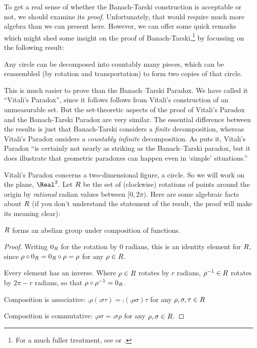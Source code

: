 \documentclass[../../../include/open-logic-section]{subfiles}
\begin{document}

To get a real sense of whether the Banach-Tarski construction is
acceptable or not, we should examine its \emph{proof}. Unfortunately,
that would require much more algebra than we can present here.
However, we can offer some quick remarks which might shed some insight
on the proof of Banach-Tarski,\footnote{For a much fuller treatment,
see \cite{Weston2003} or \cite{Wagon2016}.} by focussing on the
following result:

\begin{thm}
Any circle can be decomposed into countably many pieces, which can be
reassembled (by rotation and transportation) to form two copies of
that circle.
\end{thm}

This is much easier to prove than the Banach--Tarski Paradox. We have
called it ``Vitali's Paradox'', since it follows follows from Vitali's
\citeyear{Vitali1905} construction of an unmeasurable set.  But the
set-theoretic aspects of the proof of Vitali's Paradox and the
Banach-Tarski Paradox are very similar. The essential difference
between the results is just that Banach-Tarski considers a
\emph{finite} decomposition, whereas Vitali's Paradox onsiders a
\emph{countably infinite} decomposition.  As \citet{Weston2003}
puts it, Vitali's Paradox ``is certainly not nearly as striking as the
Banach--Tarski paradox, but it does illustrate that geometric
paradoxes can  happen even in `simple' situations.'' 

Vitali's Paradox concerns a two-dimensional figure, a circle. So we
will work on the plane, $\Real^2$. Let $R$ be the set of
(clockwise) rotations of points around the origin by \emph{rational}
radian values between $[0,2\pi)$. Here are some algebraic facts about
$R$ (if you don't understand the statement of the
result, the proof will make its meaning clear):

\begin{lem}
$R$ forms an abelian {group} under composition of functions.
\end{lem}

\begin{proof}
Writing $0_{R}$ for the rotation by $0$ radians, this is
an identity element for $R$, since
$\rho \circ 0_{R} = 0_{R} \circ \rho =
\rho$ for any $\rho \in R$.

Every element has an inverse. Where $\rho \in R$ rotates
by $r$ radians, $\rho^{-1} \in R$ rotates by $2\pi - r$
radians, so that $\rho \circ \rho^{-1} = 0_R$.

Composition is associative: $\comp{\rho}{(\comp{\sigma}{\tau})} =
\comp{(\comp{\rho}{\sigma})}{\tau}$ for any $\rho, \sigma, \tau \in
R$

Composition is commutative: $\comp{\rho}{\sigma} =
\comp{\sigma}{\rho}$ for any $\rho, \sigma \in R$.
\end{proof}
\end{document}
